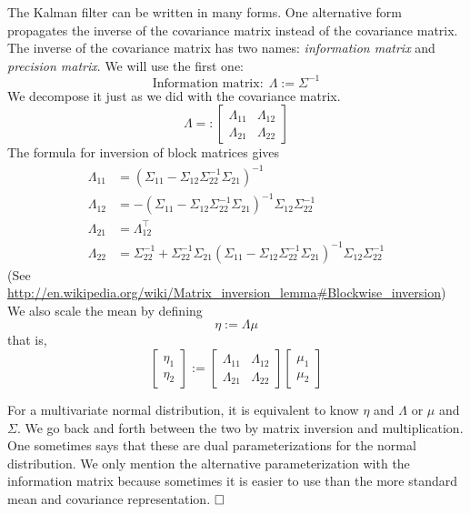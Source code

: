 { The Kalman filter can be written in many forms. One alternative form propagates the inverse of the covariance matrix instead of the covariance matrix. The inverse of the covariance matrix has two names: \textit{information matrix} and \textit{precision matrix}. We will use the first one:
 $$\text{Information matrix:}~~ \Lambda := \Sigma^{-1}$$
 We decompose it just as we did with the covariance matrix.
 $$ \Lambda =: \left[ \begin{array}{cc} \Lambda_{11} & \Lambda_{12} \\ \Lambda_{21} & \Lambda_{22} \end{array}  \right]$$
 The formula for inversion of block matrices gives
\begin{align*}
\Lambda_{11}&=(\Sigma_{11}-\Sigma_{12} \Sigma_{22}^{-1}\Sigma_{21})^{-1}\\
\Lambda_{12}&=-(\Sigma_{11}-\Sigma_{12} \Sigma_{22}^{-1}\Sigma_{21})^{-1} \Sigma_{12} \Sigma_{22}^{-1}\\
\Lambda_{21}&=\Lambda_{12}^\top \\
\Lambda_{22}&=\Sigma_{22}^{-1} + \Sigma_{22}^{-1} \Sigma_{21}
(\Sigma_{11}-\Sigma_{12} \Sigma_{22}^{-1}\Sigma_{21})^{-1} \Sigma_{12} \Sigma_{22}^{-1}
\end{align*}
(See { \small \url{http://en.wikipedia.org/wiki/Matrix_inversion_lemma#Blockwise_inversion}})\\

We also scale the mean by defining
$$\eta := \Lambda \mu$$
that is,
$$\begin{bmatrix} \eta_1 \\ \eta_2 \end{bmatrix} :=  \left[ \begin{array}{cc} \Lambda_{11} & \Lambda_{12} \\ \Lambda_{21} & \Lambda_{22} \end{array}  \right] \begin{bmatrix} \mu_1 \\ \mu_2 \end{bmatrix} $$


\begin{rem} For a multivariate normal distribution, it is equivalent to know $\eta$ and $\Lambda$ or $\mu$ and $\Sigma$. We go back and forth between the two by matrix inversion and multiplication.  One sometimes says that these are dual parameterizations for the normal distribution. We only mention the alternative parameterization with the information matrix because sometimes it is easier to use than the more standard mean and covariance representation.
$\hfill \square$  \end{rem} 

}
